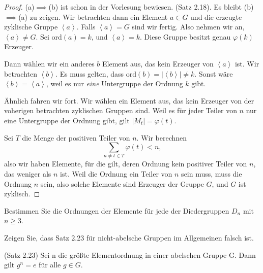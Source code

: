 \begin{proof}
	(a)$\implies$(b) ist schon in der Vorlesung bewiesen. (Satz 2.18). Es bleibt (b)$\implies$(a) zu zeigen. Wir betrachten dann ein Element $a\in G$ und die erzeugte zyklische Gruppe $\left<a \right>$. Falls $\left<a \right> = G$ sind wir fertig. Also nehmen wir an, $\left<a \right>\neq G$. Sei $\text{ord}(a)=k$, und $\left<a \right> = k$. Diese Gruppe besitzt genau $\varphi(k)$ Erzeuger.
	
	Dann wählen wir ein anderes $b$ Element aus, das kein Erzeuger von $\left<a \right>$ ist. Wir betrachten $\left<b \right>$. Es muss gelten, dass $\text{ord}(b)=\left| \left<b \right> \right| \neq k$. Sonst wäre $\left<b \right> = \left<a \right>$, weil es nur \emph{eine} Untergruppe der Ordnung $k$ gibt.

	Ähnlich fahren wir fort. Wir wählen ein Element aus, das kein Erzeuger von der voherigen betrachten zyklischen Gruppen sind. Weil es f\"{u}r jeder Teiler von $n$ nur eine Untergruppe der Ordnung gibt, gilt $|M_t|=\varphi(t)$.

	Sei $T$ die Menge der positiven Teiler von $n$. Wir berechnen
	\[
	\sum_{n\neq t\in T}\varphi(t)<n
	,\] 
	also wir haben Elemente, f\"{u}r die gilt, deren Ordnung kein positiver Teiler von $n$, das weniger als $n$ ist. Weil die Ordnung ein Teiler von $n$ sein muss, muss die Ordnung $n$ sein, also solche Elemente sind Erzeuger der Gruppe $G$, und $G$ ist zyklisch.
\end{proof}
\begin{Problem}
	\begin{parts}
	\item  Bestimmen Sie die Ordnungen der Elemente für jede der Diedergruppen $D_n$ mit $n\ge 3$.
	\item  Zeigen Sie, dass Satz 2.23 für nicht-abelsche Gruppen im Allgemeinen falsch ist.
		\begin{tcolorbox}
			(Satz 2.23) Sei n die größte Elementordnung in einer abelschen Gruppe G. Dann gilt $g^n = e$ für alle $g \in G$.
		\end{tcolorbox}
	\end{parts}
\end{Problem}
